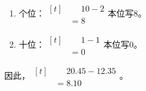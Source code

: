 {\begin{enumerate}[leftmargin=1.7em,itemsep=5pt,topsep=0pt]
\item 个位：\(\begin{aligned}[t]&\phantom{={}}10-2\\&=8\end{aligned}\)\quad 本位写8。
\item 十位：\(\begin{aligned}[t]&\phantom{={}}1-1\\&=0\end{aligned}\)\quad 本位写0。
\end{enumerate}
\par\smallskip
因此，\(\begin{aligned}[t]&\phantom{={}}20.45-12.35\\&=8.10\end{aligned}\)。
\par\medskip

}
